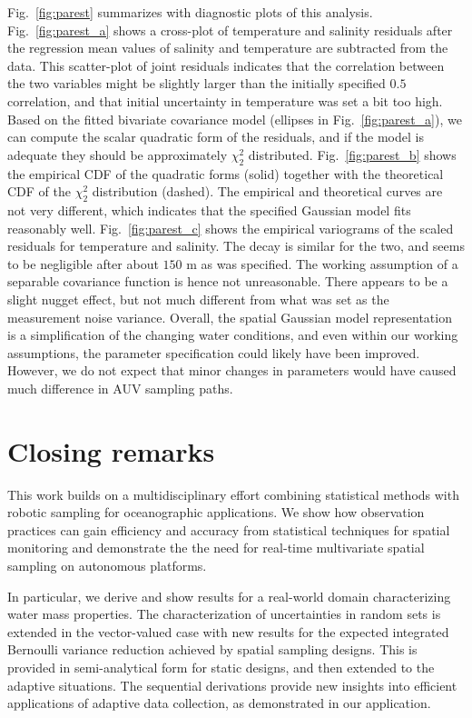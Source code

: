 \documentclass[aoas]{imsart}
\begin{document}
Fig.~\ref{fig:parest} summarizes with diagnostic plots of this
analysis. Fig.~\ref{fig:parest_a} shows a cross-plot of temperature
and salinity residuals after the regression mean values of salinity
and temperature are subtracted from the data. This scatter-plot of
joint residuals indicates that the correlation between the two
variables might be slightly larger than the initially specified $0.5$ correlation,
and that initial uncertainty in temperature was set a bit too high. Based on
the fitted bivariate covariance model (ellipses in
Fig.~\ref{fig:parest_a}), we can compute the scalar quadratic form of
the residuals, and if the model is adequate they should be
approximately $\chi^2_2$ distributed. Fig.~\ref{fig:parest_b} shows
the empirical CDF of the quadratic forms (solid) together with the
theoretical CDF of the $\chi^2_2$ distribution (dashed). The empirical
and theoretical curves are not very different, which indicates that
the specified Gaussian model fits reasonably
well. Fig.~\ref{fig:parest_c} shows the empirical variograms of the
scaled residuals for temperature and salinity. The decay is similar
for the two, and seems to be negligible after about $150$ m as was
specified. The working assumption of a separable covariance function
is hence not unreasonable. There appears to be a slight nugget effect, but not much different from what was set as the measurement noise variance.
Overall, the spatial Gaussian model representation is a simplification
of the changing water conditions, and even within our working assumptions,
the parameter specification could likely have been
improved. However, we do not expect that minor changes in parameters would have caused much
difference in AUV sampling paths.

\section{Closing remarks}
\label{sec:concl_disc}

This work builds on a multidisciplinary effort combining statistical
methods with robotic sampling for oceanographic applications. We show
how observation practices can gain efficiency and accuracy from
statistical techniques for spatial monitoring and demonstrate the the
need for real-time multivariate spatial sampling on autonomous
platforms.

In particular, we derive and show results for a real-world domain
characterizing water mass properties. The characterization of
uncertainties in random sets is extended in the vector-valued case
with new results for the expected integrated Bernoulli variance
reduction achieved by spatial sampling designs. This is provided in
semi-analytical form for static designs, and then extended to the
adaptive situations. The sequential derivations provide new insights
into efficient applications of adaptive data collection, as
demonstrated in our application.
\end{document}
